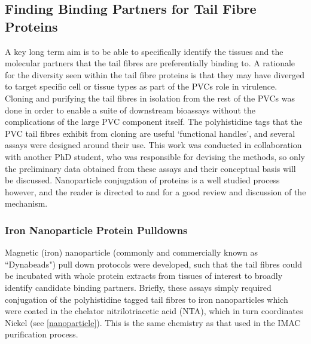 \subsection{Finding Binding Partners for Tail Fibre Proteins}
A key long term aim is to be able to specifically identify the tissues and the molecular partners that the tail fibres are preferentially binding to. A rationale for the diversity seen within the tail fibre proteins is that they may have diverged to target specific cell or tissue types as part of the PVCs role in virulence. Cloning and purifying the tail fibres in isolation from the rest of the PVCs was done in order to enable a suite of downstream bioassays without the complications of the large PVC component itself. The polyhistidine tags that the PVC tail fibres exhibit from cloning are useful `functional handles', and several assays were designed around their use. This work was conducted in collaboration with another PhD student, who was responsible for devising the methods, so only the preliminary data obtained from these assays and their conceptual basis will be discussed. Nanoparticle conjugation of proteins is a well studied process however, and the reader is directed to \cite{Sperling2010} and \cite{Hainfeld1999} for a good review and discussion of the mechanism.


\subsubsection{Iron Nanoparticle Protein Pulldowns}
Magnetic (iron) nanoparticle (commonly and commercially known as ``Dynabeads") pull down protocols were developed, such that the tail fibres could be incubated with whole protein extracts from tissues of interest to broadly identify candidate binding partners. Briefly, these assays simply required conjugation of the polyhistidine tagged tail fibres to iron nanoparticles which were coated in the chelator nitrilotriacetic acid (NTA), which in turn coordinates Nickel (see \vref{nanoparticle}). This is the same chemistry as that used in the IMAC purification process.

